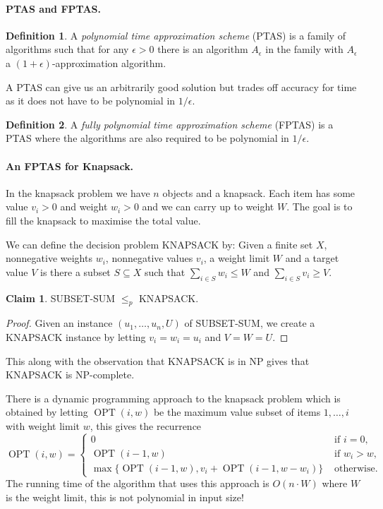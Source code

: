 \documentclass[11pt,a4paper]{article}
\theoremstyle{definition}
\newtheorem{claim}{Claim}
\newtheorem{defn}{Definition}
\DeclareMathOperator{\OPT}{OPT}
\begin{document}
\paragraph{PTAS and FPTAS.}
\begin{defn}
A \emph{polynomial time approximation scheme} (PTAS) is a family of algorithms such that for any $\epsilon > 0$ there is an algorithm $A_\epsilon$ in the family with $A_\epsilon$ a $(1+\epsilon)$-approximation algorithm.
\end{defn}

A PTAS can give us an arbitrarily good solution but trades off accuracy for time as it does not have to be polynomial in $1/\epsilon$.

\begin{defn}
A \emph{fully polynomial time approximation scheme} (FPTAS) is a PTAS where the algorithms are also required to be polynomial in $1/\epsilon$.
\end{defn}

\paragraph{An FPTAS for Knapsack.}
In the knapsack problem we have $n$ objects and a knapsack.
Each item has some value $v_i>0$ and weight $w_i>0$ and we can carry up to weight $W$.
The goal is to fill the knapsack to maximise the total value.

We can define the decision problem KNAPSACK by: Given a finite set $X$, nonnegative weights $w_i$, nonnegative values $v_i$, a weight limit $W$ and a target value $V$ is there a subset $S\subseteq X$ such that $\sum_{i\in S} w_i \le W$ and $\sum_{i\in S} v_i \ge V$.

\begin{claim}
SUBSET-SUM $\le_p$ KNAPSACK.
\end{claim}
\begin{proof}
Given an instance $(u_1,\ldots,u_n,U)$ of SUBSET-SUM, we create a KNAPSACK instance by letting $v_i = w_i = u_i$ and $V = W = U$.
\end{proof}

This along with the observation that KNAPSACK is in NP gives that KNAPSACK is NP-complete.

There is a dynamic programming approach to the knapsack problem which is obtained by letting $\OPT(i,w)$ be the maximum value subset of items $1,\ldots,i$ with weight limit $w$, this gives the recurrence
\[
\OPT(i,w) =\begin{cases}
0 &\text{ if } i = 0,\\
\OPT(i-1,w)&\text{ if } w_i> w,\\
\max\{\OPT(i-1,w), v_i +\OPT(i-1, w - w_i)\} &\text{ otherwise}.
\end{cases} 
\]
The running time of the algorithm that uses this approach is $O(n\cdot W)$ where $W$ is the weight limit, this is not polynomial in input size!
\end{document}
